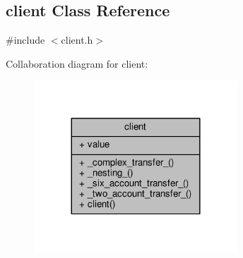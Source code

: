 \hypertarget{classclient}{}\subsection{client Class Reference}
\label{classclient}


{\ttfamily \#include $<$client.\+h$>$}



Collaboration diagram for client\+:
\nopagebreak
\begin{figure}[H]
\begin{center}
\leavevmode
\includegraphics[width=216pt]{classclient__coll__graph}
\end{center}
\end{figure}
